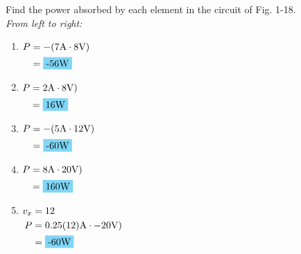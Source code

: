 Find the power absorbed by each element in the circuit of Fig. 1-18. \\[1cm]
\emph{From left to right:}
\begin{enumerate}[leftmargin=2cm,labelsep=.5cm,label=\bfseries\alph*)]
	\item $
	\begin{aligned}[t]
	P &= -(7\qw{\A}\cdot 8\qw{\V}) \\
	  &= \hlbox{-56\qw{\W}} \\
	\end{aligned} $
	\\[1cm]
	
	\item $
	\begin{aligned}[t]
	P &= 2\qw{\A}\cdot 8\qw{\V}) \\
	  &= \hlbox{16\qw{\W}} \\
	\end{aligned} $
	\\[1cm]
	
	\item $
	\begin{aligned}[t]
	P &= -(5\qw{\A}\cdot 12\qw{\V}) \\
	  &= \hlbox{-60\qw{\W}} \\
	\end{aligned} $
	\\[1cm]
	
	\item $
	\begin{aligned}[t]
	P &= 8\qw{\A}\cdot 20\qw{\V}) \\
	  &= \hlbox{160\qw{\W}} \\
	\end{aligned} $
	\\[1cm]
	

	\item $
	\begin{aligned}[t]
	v_x &= 12 \\
	P  	&= 0.25(12)\qw{\A}\cdot -20\qw{\V}) \\
		&= \hlbox{-60\qw{\W}} \\
	\end{aligned} $
	\\[1cm]
\end{enumerate}